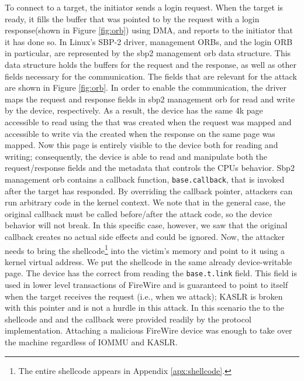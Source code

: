 To connect to a target, the initiator sends a login request. When the target is ready, it fills the buffer that was pointed to by the request with a login response(shown in Figure \ref{fig:orb}) using DMA, and reports to the initiator that it has done so. In Linux’s SBP-2 driver, management ORBs, and the login ORB in particular, are represented by the sbp2 management orb data structure. This data structure holds the buffers for the request and the response, as well as other fields necessary for the communication. The fields that are relevant for the attack are shown in Figure \ref{fig:orb}. In order to enable the communication, the driver maps the request and response fields in sbp2 management orb for read and write by the device, respectively. As a result, the device has the same 4k page accessible to read using the \iova that was created when the request was mapped and accessible to write via the \iova created when the response on the same page was mapped. Now this page is entirely visible to the device both for reading and writing; consequently, the device is able to read and manipulate both the request/response fields and the metadata that controls the CPUs behavior. Sbp2 management orb contains a callback function, \texttt{base.callback}, that is invoked after the target has responded. By overriding the callback pointer, attackers can run arbitrary code in the kernel context. We note that in the general case, the original callback must be called before/after the attack code, so the device behavior will not break. In this specific case, however, we saw that the original callback creates no actual side effects and could be ignored. Now, the attacker needs to bring the shellcode\footnote{The entire shellcode appears in Appendix \ref{apx:shellcode}.} into the victim’s memory and point to it using a kernel virtual address. We put the shellcode in the same already device-writable page. The device has the correct \kva from reading the \texttt{base.t.link} field.  This field is used in lower level transactions of FireWire and is guaranteed to point to itself when the target receives the request (i.e., when we attack); KASLR is broken with this pointer and is not a hurdle in this attack. In this scenario the \kva to the shellcode and and the callback were provided readily by the  protocol implementation. Attaching a malicious FireWire device was enough to take over the machine regardless of IOMMU and KASLR. 

 
